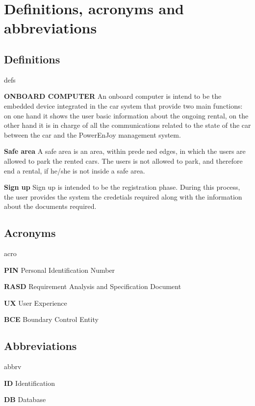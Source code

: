 \section{Definitions, acronyms and abbreviations}

\subsection{Definitions}
	\begin{labeling}{defs}
		\item[\textbf{ONBOARD COMPUTER}] An onboard computer is intend to be the embedded device integrated in the car system that provide two main functions: on one hand it shows the user basic information about the ongoing rental, on the other hand it is in charge of all the communications related to the state of the car between the car and the PowerEnJoy management system.
		\item[\textbf{Safe area}] A safe area is an area, within predened edges, in which the users are allowed to park the rented cars. The users is not allowed to park, and therefore end a rental, if he/she is not inside a safe area.
		\item[\textbf{Sign up}] Sign up is intended to be the registration phase. During this process, the user provides the system the credetials required along with the information about the documents required.
	\end{labeling}

\subsection{Acronyms}
	\begin{labeling}{acro}
		\item[\textbf{PIN}] Personal Identification Number
		\item[\textbf{RASD}] Requirement Analysis and Specification Document
		\item[\textbf{UX}] User Experience
		\item[\textbf{BCE}] Boundary Control Entity
	\end{labeling}

\subsection{Abbreviations}
	\begin{labeling}{abbrv}
		\item[\textbf{ID}] Identification
		\item[\textbf{DB}] Database
	\end{labeling}